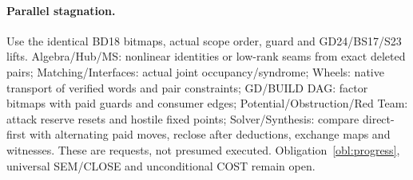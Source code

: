 \documentclass[11pt]{article}
\begin{document}
\paragraph{Parallel stagnation.} Use the identical BD18 bitmaps, actual scope order, guard and GD24/BS17/S23 lifts. Algebra/Hub/MS: nonlinear identities or low-rank seams from exact deleted pairs; Matching/Interfaces: actual joint occupancy/syndrome; Wheels: native transport of verified words and pair constraints; GD/BUILD DAG: factor bitmaps with paid guards and consumer edges; Potential/Obstruction/Red Team: attack reserve resets and hostile fixed points; Solver/Synthesis: compare direct-first with alternating paid moves, reclose after deductions, exchange maps and witnesses. These are requests, not presumed executed. Obligation~\ref{obl:progress}, universal SEM/CLOSE and unconditional COST remain open.
\end{document}
